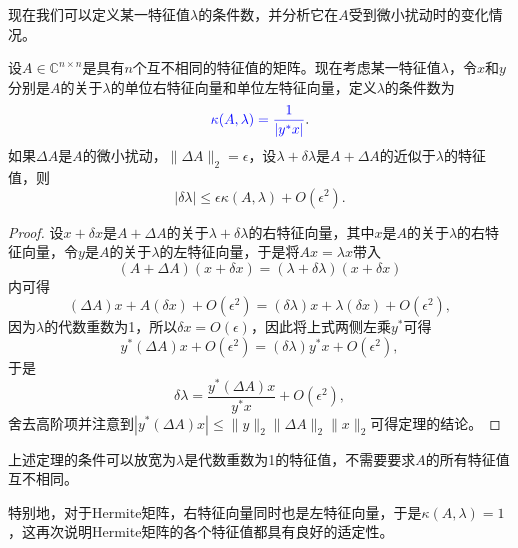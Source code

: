 \documentclass[a4paper,10pt]{ctexart}
\begin{document}
现在我们可以定义某一特征值$ \lambda $的条件数，并分析它在$ A $受到微小扰动时的变化情况。
\begin{theorem}
    设$ A\in \mathbb{C}^{n\times n} $是具有$ n $个互不相同的特征值的矩阵。现在考虑某一特征值$ \lambda $，令$ x $和$ y $分别是$ A $的关于$ \lambda $的单位右特征向量和单位左特征向量，定义$ \lambda $的条件数为
    \begin{equation}
        \textcolor{blue}{\kappa(A,\lambda) = \frac{1}{|y^* x|}}.
    \end{equation}
    如果$ \Delta A $是$ A $的微小扰动，$ \| \Delta A \|_2 = \epsilon $，设$ \lambda + \delta \lambda $是$ A+\Delta A $的近似于$ \lambda $的特征值，则
    \begin{equation}
        |\delta \lambda| \leqslant \epsilon \kappa(A,\lambda) + O(\epsilon^2).
    \end{equation}
\end{theorem}
\begin{proof}
    设$ x+\delta x $是$ A+\Delta A $的关于$ \lambda + \delta \lambda $的右特征向量，其中$ x $是$ A $的关于$ \lambda $的右特征向量，令$ y $是$ A $的关于$ \lambda $的左特征向量，于是将$ A x = \lambda x $带入
    \[
        (A+\Delta A)(x+\delta x) = (\lambda + \delta \lambda)(x+\delta x)
    \]
    内可得
    \[
        (\Delta A) x + A (\delta x) + O(\epsilon^2) = (\delta \lambda) x + \lambda (\delta x) + O(\epsilon^2),
    \]
    因为$ \lambda $的代数重数为1，所以$ \delta x = O(\epsilon) $，因此将上式两侧左乘$ y^* $可得
    \[
        y^* (\Delta A) x + O(\epsilon^2) = (\delta \lambda) y^* x + O(\epsilon^2),
    \]
    于是
    \[
        \delta \lambda = \frac{y^* (\Delta A)x}{y^* x} + O(\epsilon^2),
    \]
    舍去高阶项并注意到$ |y^* (\Delta A)x|\leqslant \| y \|_2 \| \Delta A \|_2 \| x \|_2 $可得定理的结论。
\end{proof}
上述定理的条件可以放宽为$ \lambda $是代数重数为1的特征值，不需要要求$ A $的所有特征值互不相同。

特别地，对于Hermite矩阵，右特征向量同时也是左特征向量，于是$ \kappa(A,\lambda) = 1 $，这再次说明Hermite矩阵的各个特征值都具有良好的适定性。
\end{document}
